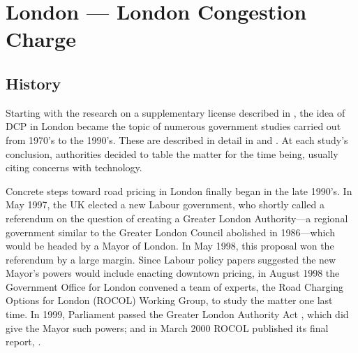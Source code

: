 \section{London --- London Congestion Charge}

\subsection{History}

Starting with the research on a supplementary license described in \citet{Thomson1967a}, the idea of DCP in London became the topic of numerous government studies carried out from 1970's to the 1990's. These are described in detail in \citet[Ch. 4]{Richards2006} and \citet[Ch. 4]{Gomez-Ibanez1994}. At each study's conclusion, authorities decided to table the matter for the time being, usually citing concerns with technology.


Concrete steps toward road pricing in London finally began in the late 1990's. In May 1997, the UK elected a new Labour government, who shortly called a referendum on the question of creating a Greater London Authority---a regional government similar to the Greater London Council abolished in 1986---which would be headed by a Mayor of London. In May 1998, this proposal won the referendum by a large margin. Since Labour policy papers suggested the new Mayor's powers would include enacting downtown pricing, in August 1998 the Government Office for London convened a team of experts, the Road Charging Options for London (ROCOL) Working Group, to study the matter one last time. In 1999, Parliament passed the Greater London Authority Act \citep{Parliament1999}, which did give the Mayor such powers; and in March 2000 ROCOL published its final report, \citep{ROCOL2000}.

